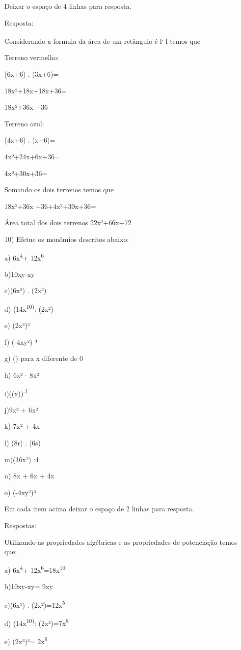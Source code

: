Deixar o espaço de 4 linhas para resposta.

Resposta:

Considerando a formula da área de um retângulo é l\textsuperscript{.} l
temos que

Terreno vermelho:

(6x+6) . (3x+6)=

18x²+18x+18x+36=

18x²+36x +36

Terreno azul:

(4x+6) . (x+6)=

4x²+24x+6x+36=

4x²+30x+36=

Somando os dois terrenos temos que

18x²+36x +36+4x²+30x+36=

Área total dos dois terrenos 22x²+66x+72

10) Efetue os monômios descritos abaixo:

a) 6x\textsuperscript{4}+ 12x\textsuperscript{6}

b)10xy-xy

c)(6x³) . (2x²)

d) (14x\textsuperscript{10)}: (2x²)

e) (2x³)³

f) (-4xy²) ³

g) () para x diferente de 0

h) 6x² - 8x²

i)((x))\textsuperscript{-1}

j)9x² + 6x²

k) 7x² + 4x

l) (8r) . (6s)

m)(16x²) :4

n) 8x + 6x + 4x

o) (-4xy²)³

Em cada item acima deixar o espaço de 2 linhas para resposta.

Respostas:

Utilizando as propriedades algébricas e as propriedades de potenciação
temos que:

a) 6x\textsuperscript{4}+ 12x\textsuperscript{6}=18x\textsuperscript{10}

b)10xy-xy= 9xy

c)(6x³) . (2x²)=12x\textsuperscript{5}

d) (14x\textsuperscript{10)}: (2x²)=7x\textsuperscript{8}

e) (2x³)³= 2x\textsuperscript{9}

